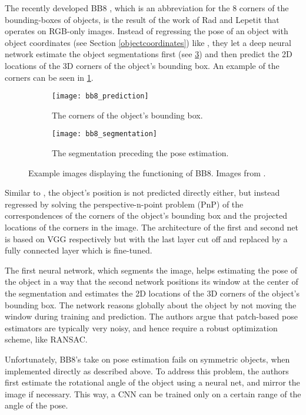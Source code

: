 The recently developed BB8 \cite{bb8}, which is an abbreviation for the 8 corners of the bounding-boxes of objects, is the result of the work of Rad and Lepetit that operates on RGB-only images. Instead of regressing the pose of an object with object coordinates (see Section \ref{objectcoordinates}) like \cite{brachmann1}, they let a deep neural network estimate the object segmentations first (see \fig \ref{fig:bb8_segmentation}) and then predict the 2D locations of the 3D corners of the object's bounding box. An example of the corners can be seen in \fig \ref{fig:bb8}.

\begin{figure}[!tbp]
	\centering
	\begin{subfigure}[b]{0.45\textwidth}
		\centering
    	\texttt{[image: bb8\_prediction]}
    	\caption{The corners of the object's bounding box.}
    	\label{fig:bb8}
	\end{subfigure}
	\hfill
	\begin{subfigure}[b]{0.45\textwidth}
		\centering
    	\texttt{[image: bb8\_segmentation]}
    	\caption{The segmentation preceding the pose estimation.}
    	\label{fig:bb8_segmentation}
	\end{subfigure}
	\caption{Example images displaying the functioning of BB8. Images from \cite{bb8}.}
\end{figure} 

Similar to \cite{brachmann1}, the object's position is not predicted directly either, but instead regressed by solving the perspective-n-point problem (PnP) of the correspondences of the corners of the object's bounding box and the projected locations of the corners in the image. The architecture of the first and second net is based on VGG \cite{vgg} respectively but with the last layer cut off and replaced by a fully connected layer which is fine-tuned. 

The first neural network, which segments the image, helps estimating the pose of the object in a way that the second network positions its window at the center of the segmentation and estimates the 2D locations of the 3D corners of the object's bounding box. The network reasons globally about the object by not moving the window during training and prediction. The authors argue that patch-based pose estimators are typically very noisy, and hence require a robust optimization scheme, like RANSAC. 

Unfortunately, BB8's take on pose estimation fails on symmetric objects, when implemented directly as described above. To address this problem, the authors first estimate the rotational angle of the object using a neural net, and mirror the image if necessary. This way, a CNN can be trained only on a certain range of the angle of the pose.

